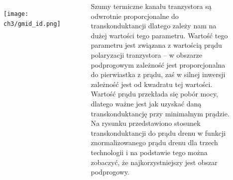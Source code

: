 \begin{frame}[t]
    \begin{block}{\dk}
    \end{block}
    \begin{columns}
        \begin{figure}[H]
            \texttt{[image: ch3/gmid\_id.png]} 
        \end{figure}
    
        Szumy termiczne kanału tranzystora są odwrotnie proporcjonalne do transkonduktancji dlatego zależy nam na dużej wartości tego parametru. 
        Wartość tego parametru jest związana z wartością prądu polaryzacji tranzystora -- w obszarze podprogowym zależność jest proporcjonalna do pierwiastka z prądu, zaś w silnej inwersji zależność jest od kwadratu tej wartości.
        Wartość prądu  przekłada się pobór mocy, dlatego ważne jest jak uzyskać daną transkonduktancję przy minimalnym prądzie. 
        Na rysunku przedstawiono stosunek transkonduktancji do prądu drenu w funkcji znormalizowanego prądu drenu dla trzech technologii i na podstawie tego można zobaczyć, że najkorzystniejszy jest obszar podprogowy.
     \end{columns}
\end{frame}

